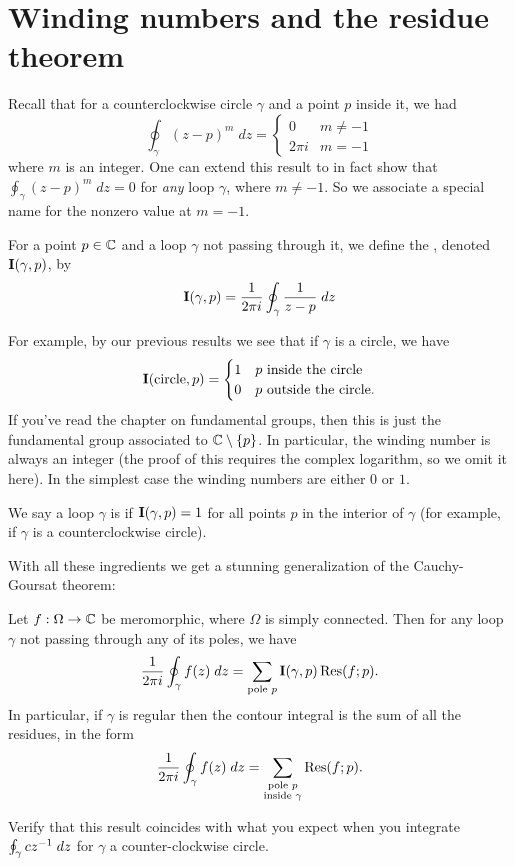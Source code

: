 \section{Winding numbers and the residue theorem}
Recall that for a counterclockwise circle $\gamma$ and a point $p$ inside it, we had
\[
	\oint_{\gamma} (z-p)^m \; dz =
	\begin{cases}
		0 & m \neq -1 \\
		2\pi i & m = -1
	\end{cases}
\]
where $m$ is an integer.
One can extend this result to in fact show that $\oint_\gamma (z-p)^m \; dz = 0$
for \emph{any} loop $\gamma$, where $m \neq -1$.
So we associate a special name for the nonzero value at $m=-1$.
\begin{definition}
	For a point $p \in \mathbb C$ and a loop $\gamma$ not passing through it,
	we define the , denoted $\operatorname{\mathbf I}(\gamma, p)$, by
	\[
		\operatorname{\mathbf I}(\gamma, p) = \frac{1}{2\pi i} \oint_{\gamma} \frac{1}{z-p} \; dz
	\]
\end{definition}
For example, by our previous results we see that if $\gamma$ is a circle, we have
\[
	\operatorname{\mathbf I}(\text{circle}, p)
	=
	\begin{cases}
		1 & \text{$p$ inside the circle} \\
		0 & \text{$p$ outside the circle}.
	\end{cases}
\]
If you've read the chapter on fundamental groups, then this is just the fundamental group
associated to $\mathbb C \setminus \{p\}$.
In particular, the winding number is always an integer (the proof of this requires the complex logarithm,
so we omit it here).
In the simplest case the winding numbers are either $0$ or $1$.
\begin{definition}
	We say a loop $\gamma$ is  if $\operatorname{\mathbf I}(\gamma, p) = 1$
	for all points $p$ in the interior of $\gamma$ (for example,
	if $\gamma$ is a counterclockwise circle).
\end{definition}

With all these ingredients we get a stunning generalization of the Cauchy-Goursat theorem:
\begin{theorem}
	Let $f : \Omega \to \mathbb C$ be meromorphic, where $\Omega$ is simply connected.
	Then for any loop $\gamma$ not passing through any of its poles, we have
	\[
		\frac{1}{2\pi i} \oint_{\gamma} f(z) \; dz
		= \sum_{\text{pole $p$}} \operatorname{\mathbf I}(\gamma, p) \operatorname{Res}(f; p).
	\]
	In particular, if $\gamma$ is regular then the contour integral
	is the sum of all the residues, in the form
	\[
		\frac{1}{2\pi i} \oint_{\gamma} f(z) \; dz
		= \sum_{\substack{\text{pole $p$} \\ \text{inside $\gamma$}}}  \operatorname{Res}(f; p).
	\]
\end{theorem}
\begin{ques}
	Verify that this result coincides
	with what you expect when you integrate $\oint_\gamma cz^{-1} \; dz$
	for $\gamma$ a counter-clockwise circle.
\end{ques}

